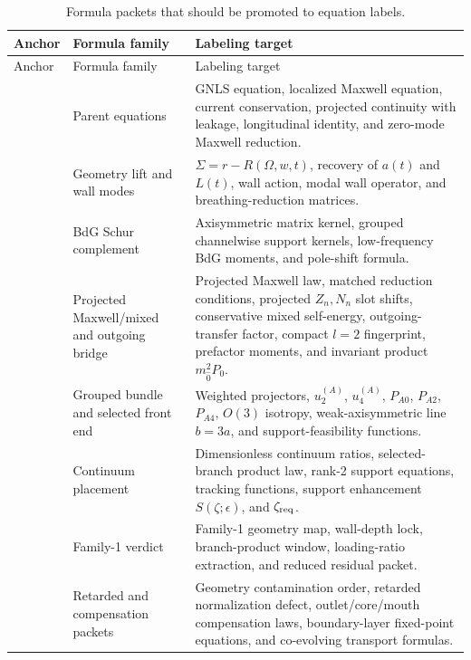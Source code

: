 \begin{longtable}{L{0.14\textwidth}L{0.30\textwidth}L{0.46\textwidth}}
\caption{Formula packets that should be promoted to equation labels.}\label{tab:anchor-formula-packets}\\
\toprule
Anchor & Formula family & Labeling target \\
\midrule
\endfirsthead
\toprule
Anchor & Formula family & Labeling target \\
\midrule
\endhead
{} & Parent equations & GNLS equation, localized Maxwell equation, current conservation, projected continuity with leakage, longitudinal identity, and zero-mode Maxwell reduction. \\
\addlinespace
{} & Geometry lift and wall modes & \(\Sigma=r-R(\Omega,w,t)\), recovery of \(a(t)\) and \(L(t)\), wall action, modal wall operator, and breathing-reduction matrices. \\
\addlinespace
{} & BdG Schur complement & Axisymmetric matrix kernel, grouped channelwise support kernels, low-frequency BdG moments, and pole-shift formula. \\
\addlinespace
{} & Projected Maxwell/mixed and outgoing bridge & Projected Maxwell law, matched reduction conditions, projected \(Z_n,N_n\) slot shifts, conservative mixed self-energy, outgoing-transfer factor, compact \(l=2\) fingerprint, prefactor moments, and invariant product \(m_{\hat 0}^{2}P_0\). \\
\addlinespace
{} & Grouped bundle and selected front end & Weighted projectors, \(u_2^{(A)}\), \(u_4^{(A)}\), \(P_{A0}\), \(P_{A2}\), \(P_{A4}\), \(O(3)\) isotropy, weak-axisymmetric line \(b=3a\), and support-feasibility functions. \\
\addlinespace
{} & Continuum placement & Dimensionless continuum ratios, selected-branch product law, rank-2 support equations, tracking functions, support enhancement \(S(\zeta;\epsilon)\), and \(\zeta_{\rm req}\). \\
\addlinespace
{} & Family-1 verdict & Family-1 geometry map, wall-depth lock, branch-product window, loading-ratio extraction, and reduced residual packet. \\
\addlinespace
{} & Retarded and compensation packets & Geometry contamination order, retarded normalization defect, outlet/core/mouth compensation laws, boundary-layer fixed-point equations, and co-evolving transport formulas. \\

\end{longtable}
